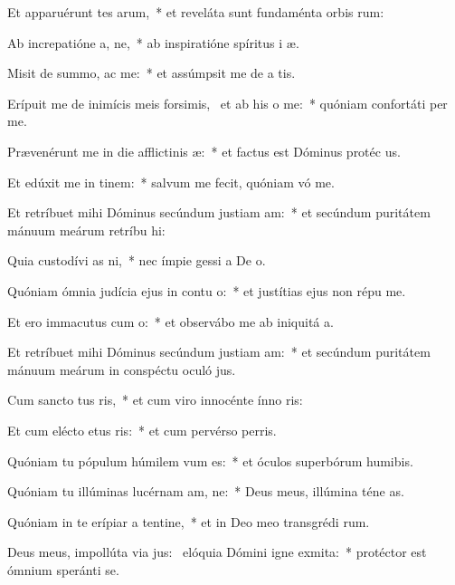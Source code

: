 \item Et apparuérunt tes arum,~* et reveláta sunt fundaménta orbis rum:
\item Ab increpatióne a, ne,~* ab inspiratióne spíritus i æ.
\item Misit de summo,  ac me:~* et assúmpsit me de a tis.
\item Erípuit me de inimícis meis forsimis,~\pscross{} et ab his  o me:~* quóniam confortáti  per me.
\item Prævenérunt me in die afflictinis æ:~* et factus est Dóminus protéc us.
\item Et edúxit me in tinem:~* salvum me fecit, quóniam vó me.
\item Et retríbuet mihi Dóminus secúndum justiam am:~* et secúndum puritátem mánuum meárum retríbu hi:
\item Quia custodívi as ni,~* nec ímpie gessi a De o.
\item Quóniam ómnia judícia ejus in contu o:~* et justítias ejus non répu  me.
\item Et ero immacutus cum o:~* et observábo me ab iniquitá a.
\item Et retríbuet mihi Dóminus secúndum justiam am:~* et secúndum puritátem mánuum meárum in conspéctu oculó jus.
\item Cum sancto tus ris,~* et cum viro innocénte ínno ris:
\item Et cum elécto etus ris:~* et cum pervérso perris.
\item Quóniam tu pópulum húmilem vum es:~* et óculos superbórum humibis.
\item Quóniam tu illúminas lucérnam am, ne:~* Deus meus, illúmina téne as.
\item Quóniam in te erípiar a tentine,~* et in Deo meo transgrédi rum.
\item Deus meus, impollúta via jus:~\pscross{} elóquia Dómini igne exmita:~* protéctor est ómnium speránti  se.
